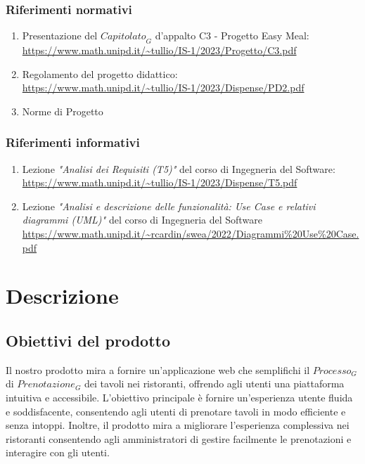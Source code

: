 \documentclass[12pt, oneside]{article}
\begin{document}
\subsubsection{Riferimenti normativi}
\begin{enumerate}
    \item Presentazione del $\textit{Capitolato}_G$ d'appalto C3 - Progetto Easy Meal: \\ \url{https://www.math.unipd.it/~tullio/IS-1/2023/Progetto/C3.pdf}
    \item Regolamento del progetto didattico: \\ \url{https://www.math.unipd.it/~tullio/IS-1/2023/Dispense/PD2.pdf}
    \item Norme di Progetto
\end{enumerate}
\subsubsection{Riferimenti informativi}
\begin{enumerate}
    \item Lezione \emph{"Analisi dei Requisiti (T5)"} del corso di Ingegneria del Software: \\ \url{https://www.math.unipd.it/~tullio/IS-1/2023/Dispense/T5.pdf}
    \item Lezione \emph{"Analisi e descrizione delle funzionalità: Use Case e relativi diagrammi (UML)"} del corso di Ingegneria del Software \\ \url{https://www.math.unipd.it/~rcardin/swea/2022/Diagrammi%20Use%20Case.pdf}
\end{enumerate}
\newpage

\section{Descrizione}
\subsection{Obiettivi del prodotto}
Il nostro prodotto mira a fornire un'applicazione web che semplifichi il $\textit{Processo}_G$ di $\textit{Prenotazione}_G$ dei tavoli nei ristoranti, offrendo agli utenti una piattaforma intuitiva e accessibile. L'obiettivo principale è fornire un'esperienza utente fluida e soddisfacente, consentendo agli utenti di prenotare tavoli in modo efficiente e senza intoppi. Inoltre, il prodotto mira a migliorare l'esperienza complessiva nei ristoranti consentendo agli amministratori di gestire facilmente le prenotazioni e interagire con gli utenti.
\end{document}

